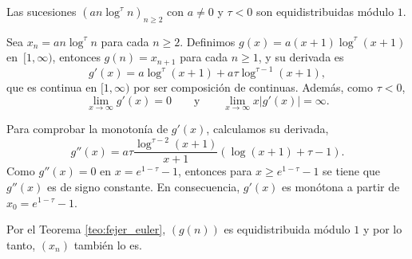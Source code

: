\begin{example}
    Las sucesiones $(an\log^\tau n)_{n\geq2}$ con $a \neq 0$ y $\tau < 0$ son equidistribuidas módulo $1$.
\end{example}

\begin{resolve}
    Sea $x_n = an\log^\tau n$ para cada $n \geq 2$. Definimos $g(x) = a(x+1)\log^\tau (x+1)$
    en~$[1,\infty)$, entonces $g(n) = x_{n+1}$ para cada $n \geq 1$, y su derivada es 
    \[
        g'(x) = a \log^{\tau}(x+1) + a \tau \log^{\tau-1}(x+1),
    \]
    que es continua en $[1,\infty)$ por ser composición de continuas. Además, como $\tau < 0$, 
    \[
        \lim_{x \to \infty} g'(x) = 0
        \qquad \text{y} \qquad
        \lim_{x \to \infty} x |g'(x)| = \infty.
    \]

    Para comprobar la monotonía de $g'(x)$, calculamos su derivada,
    \[
        g''(x) = a \tau \frac{\log^{\tau-2}(x+1)}{x+1} \left(\log(x+1) + \tau - 1\right).
    \]
    Como $g''(x)=0$ en $x = e^{1-\tau} - 1$, entonces para $x \geq e^{1-\tau} - 1$ 
    se tiene que $g''(x)$ es de signo constante. En consecuencia, $g'(x)$ es monótona a 
    partir de $x_0 = e^{1-\tau} - 1$.

    Por el Teorema \ref{teo:fejer_euler}, $(g(n))$ es equidistribuida módulo $1$ y 
    por lo tanto, $(x_n)$ también lo es.
\end{resolve}